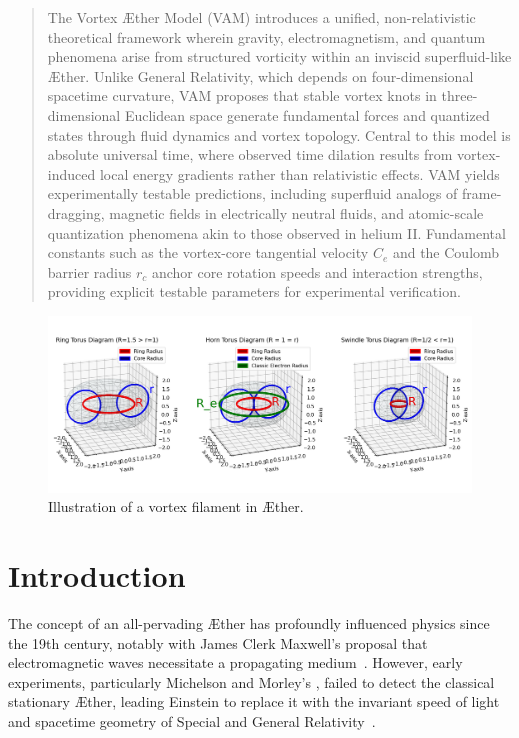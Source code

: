 \begin{abstract}
    The Vortex Æther Model (VAM) introduces a unified, non-relativistic theoretical framework wherein gravity, electromagnetism, and quantum phenomena arise from structured vorticity within an inviscid superfluid-like Æther. Unlike General Relativity, which depends on four-dimensional spacetime curvature, VAM proposes that stable vortex knots in three-dimensional Euclidean space generate fundamental forces and quantized states through fluid dynamics and vortex topology. Central to this model is absolute universal time, where observed time dilation results from vortex-induced local energy gradients rather than relativistic effects. VAM yields experimentally testable predictions, including superfluid analogs of frame-dragging, magnetic fields in electrically neutral fluids, and atomic-scale quantization phenomena akin to those observed in helium II. Fundamental constants such as the vortex-core tangential velocity $C_e$ and the Coulomb barrier radius $r_c$ anchor core rotation speeds and interaction strengths, providing explicit testable parameters for experimental verification.
\end{abstract}

\maketitle

\begin{figure}[h]
    \includegraphics[width=\textwidth]{torus}
    \caption{Illustration of a vortex filament in Æther.}
    \label{fig:vortex}
\end{figure}


\section{Introduction}

The concept of an all-pervading Æther has profoundly influenced physics since the 19th century, notably with James Clerk Maxwell’s proposal that electromagnetic waves necessitate a propagating medium~\cite{Maxwell1865}. However, early experiments, particularly Michelson and Morley's \cite{michelson1887}, failed to detect the classical stationary Æther, leading Einstein to replace it with the invariant speed of light and spacetime geometry of Special and General Relativity~\cite{einstein1916foundation}.

